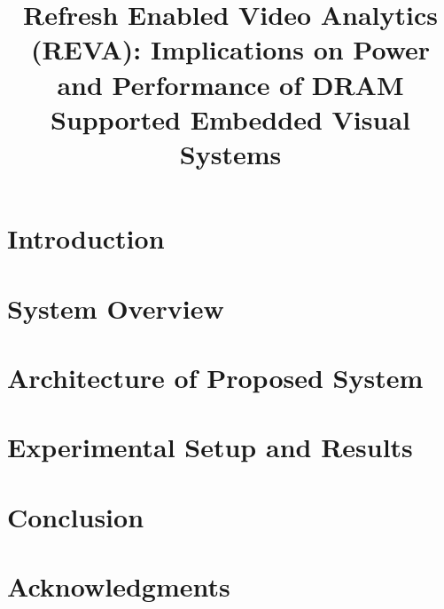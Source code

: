 \documentclass[conference]{IEEEtran}
\begin{document}



\large
\title{Refresh Enabled Video Analytics (REVA): Implications on Power and Performance of DRAM Supported Embedded Visual Systems}
\normalsize
\vspace{-0.2in}
\author{ 
}


\date{}
\maketitle

\thispagestyle{empty}

\begin{abstract}
\label{sec:abstract}	%

\end{abstract}

\section{Introduction}
\label{sec:introduction}			%


\section{System Overview}
\label{sec:background}			%



\section{Architecture of Proposed System}
\label{sec:architecture}			%



\section{Experimental Setup and Results}
\label{sec:results}			%


\section{Conclusion}
\label{sec:conclusion}			%



\section*{Acknowledgments}
\label{sec:acknowledgments}			%



\small

\end{document}
